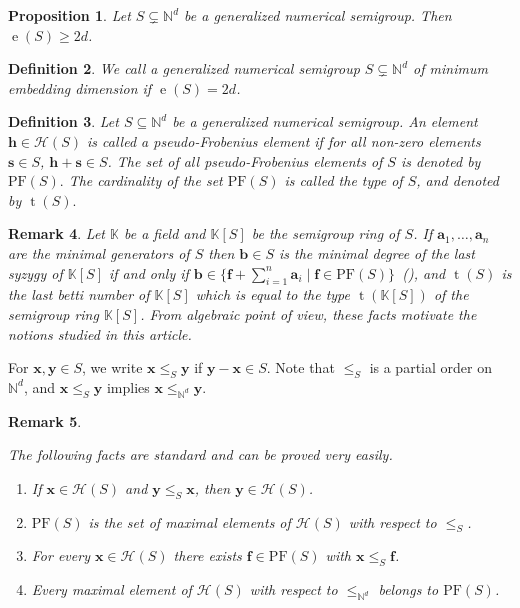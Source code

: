 \documentclass[12pt]{amsart}
\theoremstyle{plain}
\theoremstyle{theorem}
\newtheorem{definition}{Definition}[section]
\newtheorem{proposition}[definition]{Proposition}
\newtheorem{remark}[definition]{Remark}
\theoremstyle{remark}
\begin{document}
\begin{proposition}\cite{garcia2018extension}
	Let $S\subsetneq \mathbb{N}^d$ be a generalized numerical semigroup. Then $\operatorname{e}(S)\geq 2d$.
\end{proposition}

\begin{definition}
 {\rm   We call a generalized numerical semigroup $S \subsetneq \mathbb{N}^d$ of\textit{ minimum embedding dimension} if $\operatorname{e}(S) = 2d$.}
\end{definition}

\begin{definition}
	{\rm Let $S\subseteq \mathbb{N}^d$ be a generalized numerical semigroup. An element $\mathbf{h} \in \mathcal{H}(S)$ is called a \textit{pseudo-Frobenius element} if for all non-zero elements $\mathbf{s} \in S$, $\mathbf{h}+\mathbf{s} \in S$. The set of all pseudo-Frobenius elements of $S$ is denoted by $\mathrm{PF}(S).$ The cardinality of the set $\mathrm{PF}(S)$ is called the \textit{type} of $S$, and denoted by $\operatorname{t}(S).$}
\end{definition}

\begin{remark}
   {\rm Let $\mathbb{K}$ be a field and $\mathbb{K}[S]$ be the semigroup ring of $S$. If $\mathbf{a}_1, \ldots, \mathbf{a}_n$ are the minimal generators of $S$ then $\mathbf{b} \in S$ is the minimal degree of the last syzygy of $\mathbb{K}[S]$ if and only if 
   $\mathbf{b} \in \{\mathbf{f} + \sum_{i = 1}^n \mathbf{a}_i \mid \mathbf{f} \in \mathrm{PF}(S)\} $~(\cite[Corollary~7]{garcia-pseudofrobenius}), and $\operatorname{t}(S)$ is the last betti number of $\mathbb{K}[S]$ which is equal to the type $\operatorname{t}(\mathbb{K}[S])$ of the semigroup ring $\mathbb{K}[S]$. From algebraic point of view, these facts motivate the notions studied in this article. }
\end{remark}

 For $\mathbf{x}, \mathbf{y} \in S$, we write $\mathbf{x} \leq_{S} \mathbf{y}$ if $\mathbf{y} - \mathbf{x} \in S$. Note that $\leq_{S}$ is a partial order on $\mathbb{N}^d$, and $\mathbf{x} \leq_{S} \mathbf{y}$ implies  $\mathbf{x} \leq_{\mathbb{N}^d} \mathbf{y}$.

\begin{remark}\label{rmk:prelim}
 {\rm    The following facts are standard and can be proved very easily.
 \begin{enumerate}
     \item If $\mathbf{x} \in \mathcal{H}(S)$ and $\mathbf{y} \leq_{S} \mathbf{x}$, then $\mathbf{y} \in \mathcal{H}(S)$.
     \item  $\mathrm{PF}(S)$ is the set of maximal elements of $\mathcal{H}(S)$ with respect to $\leq_{S}$.
     \item  For every $\mathbf{x} \in \mathcal{H}(S)$ there exists $\mathbf{f} \in \mathrm{PF}(S)$ with $\mathbf{x} \leq_{S} \mathbf{f}$.
     \item  Every maximal element of $\mathcal{H}(S)$ with respect to $\leq_{\mathbb{N}^d}$ belongs to $\mathrm{PF}(S)$.
 \end{enumerate}
 }
\end{remark}
\end{document}
